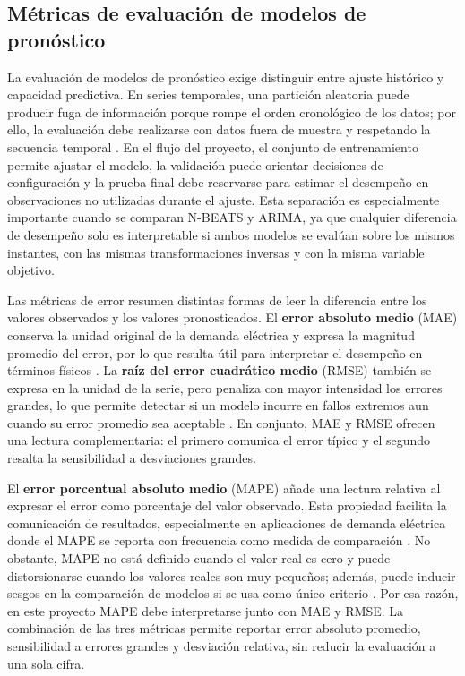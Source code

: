 \subsection{Métricas de evaluación de modelos de pronóstico}

La evaluación de modelos de pronóstico exige distinguir entre ajuste histórico y capacidad predictiva. En series temporales, una partición aleatoria puede producir fuga de información porque rompe el orden cronológico de los datos; por ello, la evaluación debe realizarse con datos fuera de muestra y respetando la secuencia temporal \parencites{tashman2000,hyndman2021}. En el flujo del proyecto, el conjunto de entrenamiento permite ajustar el modelo, la validación puede orientar decisiones de configuración y la prueba final debe reservarse para estimar el desempeño en observaciones no utilizadas durante el ajuste. Esta separación es especialmente importante cuando se comparan N-BEATS y ARIMA, ya que cualquier diferencia de desempeño solo es interpretable si ambos modelos se evalúan sobre los mismos instantes, con las mismas transformaciones inversas y con la misma variable objetivo.

Las métricas de error resumen distintas formas de leer la diferencia entre los valores observados y los valores pronosticados. El \textbf{error absoluto medio} (MAE) conserva la unidad original de la demanda eléctrica y expresa la magnitud promedio del error, por lo que resulta útil para interpretar el desempeño en términos físicos \parencites{hyndman2021,willmott2005}. La \textbf{raíz del error cuadrático medio} (RMSE) también se expresa en la unidad de la serie, pero penaliza con mayor intensidad los errores grandes, lo que permite detectar si un modelo incurre en fallos extremos aun cuando su error promedio sea aceptable \parencites{hyndman2021,chai2014}. En conjunto, MAE y RMSE ofrecen una lectura complementaria: el primero comunica el error típico y el segundo resalta la sensibilidad a desviaciones grandes.

El \textbf{error porcentual absoluto medio} (MAPE) añade una lectura relativa al expresar el error como porcentaje del valor observado. Esta propiedad facilita la comunicación de resultados, especialmente en aplicaciones de demanda eléctrica donde el MAPE se reporta con frecuencia como medida de comparación \parencites{vivas2020,hyndman2021}. No obstante, MAPE no está definido cuando el valor real es cero y puede distorsionarse cuando los valores reales son muy pequeños; además, puede inducir sesgos en la comparación de modelos si se usa como único criterio \parencites{hyndman2006,demyttenaere2016}. Por esa razón, en este proyecto MAPE debe interpretarse junto con MAE y RMSE. La combinación de las tres métricas permite reportar error absoluto promedio, sensibilidad a errores grandes y desviación relativa, sin reducir la evaluación a una sola cifra.

